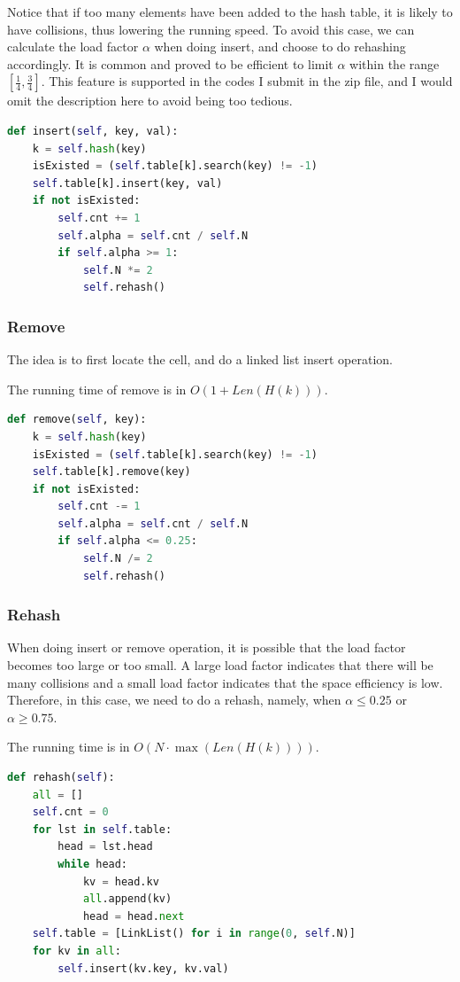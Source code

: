 \documentclass{article}
\begin{document}
\begin{spacing}{1.2}
Notice that if too many elements have been added to the hash table, it is likely to have collisions, thus lowering the running speed. To avoid this case, we can calculate the load factor $\alpha$ when doing insert, and choose to do rehashing accordingly. 
It is common and proved to be efficient to limit $\alpha$ within the range $[\frac{1}{4}, \frac{3}{4}]$. This feature is supported in the codes I submit in the zip file, and I would omit the description here to avoid being too tedious.
\begin{lstlisting}[language=Python]
def insert(self, key, val):
    k = self.hash(key)
    isExisted = (self.table[k].search(key) != -1)
    self.table[k].insert(key, val)
    if not isExisted:
        self.cnt += 1
        self.alpha = self.cnt / self.N
        if self.alpha >= 1:
            self.N *= 2
            self.rehash()
\end{lstlisting}

\subsubsection{Remove}
The idea is to first locate the cell, and do a linked list insert operation.

The running time of remove is in $O(1 + Len(H(k)))$.
\begin{lstlisting}[language=Python]
def remove(self, key):
    k = self.hash(key)
    isExisted = (self.table[k].search(key) != -1)
    self.table[k].remove(key)
    if not isExisted:
        self.cnt -= 1
        self.alpha = self.cnt / self.N
        if self.alpha <= 0.25:
            self.N /= 2
            self.rehash()
\end{lstlisting}

\subsubsection{Rehash}
When doing insert or remove operation, it is possible that the load factor becomes too large or too small. A large load factor indicates that there will be many collisions and a small load factor indicates that the space efficiency is low. Therefore, in this case, we need to do a rehash, namely, when $\alpha \leq 0.25$ or $\alpha \geq 0.75$.

The running time is in $O(N\cdot\max(Len(H(k))))$.
\begin{lstlisting}[language=Python]
def rehash(self):
    all = []
    self.cnt = 0
    for lst in self.table:
        head = lst.head
        while head:
            kv = head.kv
            all.append(kv)
            head = head.next
    self.table = [LinkList() for i in range(0, self.N)]
    for kv in all:
        self.insert(kv.key, kv.val)
\end{lstlisting}


\end{spacing}
\end{document}
